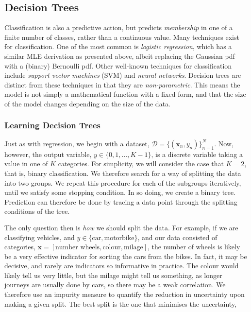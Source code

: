 \documentclass[11pt]{amsart}
\begin{document}
\subsection{Decision Trees}

Classification is also a predictive action, but predicts \emph{membership} in one of a finite number of classes, rather than a continuous value. Many techniques exist for classification. One of the most common is \emph{logistic regression}, which has a similar MLE derivation as presented above, albeit replacing the Gaussian pdf with a (binary) Bernoulli pdf. Other well-known techniques for classification include \emph{support vector machines} (SVM) and \emph{neural networks}. Decision trees are distinct from these techniques in that they are \emph{non-parametric}. This means the model is not simply a mathematical function with a fixed form, and that the size of the model changes depending on the size of the data.

\subsubsection{Learning Decision Trees}

Just as with regression, we begin with a dataset, $\mathcal{D} = \{(\mathbf{x}_n, y_n)\}_{n=1}^{N}$. Now, however, the output variable, $y \in \{0, 1, \dots, K-1\}$, is a discrete variable taking a value in one of $K$ categories. For simplicity, we will consider the case that $K = 2$, that is, binary classification. We therefore search for a way of splitting the data into two groups. We repeat this procedure for each of the subgroups iteratively, until we satisfy some stopping condition. In so doing, we create a binary tree. Prediction can therefore be done by tracing a data point through the splitting conditions of the tree.

The only question then is \emph{how} we should split the data. For example, if we are classifying vehicles, and $y \in \{\text{car}, \text{motorbike}\}$, and our data consisted of categories, $\mathbf{x} = [\text{number wheels}, \text{colour}, \text{milage}]$, the number of wheels is likely be a very effective indicator for sorting the cars from the bikes. In fact, it may be decisive, and rarely are indicators so informative in practice. The colour would likely tell us very little, but the milage might tell us something, as longer journeys are usually done by cars, so there may be a weak correlation. We therefore use an impurity measure to quantify the reduction in uncertainty upon making a given split. The best split is the one that minimises the uncertainty,
\end{document}

